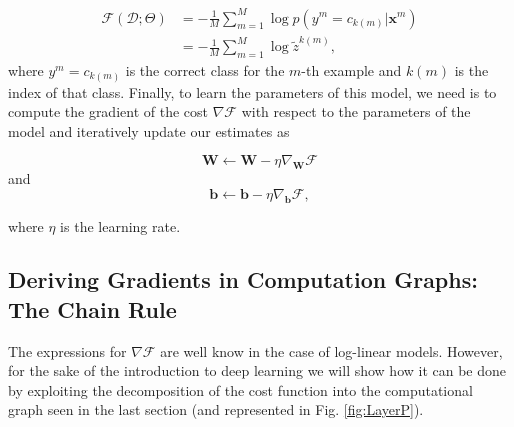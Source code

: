 \begin{align}
\mathcal{F}(\mathcal{D};\Theta) 
& = -\frac{1}{M}\sum_{m=1}^{M} \log p(y^m=c_{k(m)} | \mathbf{x}^m) \\
& = -\frac{1}{M}\sum_{m=1}^{M} \log \tilde{{z}}^{k(m)} ,
\label{eq:CostLogPos}
\end{align}
%
where $y^m=c_{k(m)}$ is the correct class for the $m$-th
example and $k(m)$ is the index of that class.
Finally, to learn the parameters of this model, we need is to compute the gradient
of the cost $\nabla\mathcal{F}$ with respect to the parameters of the model and
iteratively update our estimates as 

\begin{equation}
\mathbf{W} \leftarrow \mathbf{W} - \eta \nabla_\mathbf{W}\mathcal{F}
\end{equation}
and
\begin{equation}
\mathbf{b} \leftarrow \mathbf{b} - \eta \nabla_\mathbf{b}\mathcal{F},
\end{equation}

\noindent where $\eta$ is the learning rate.



\subsection{Deriving Gradients in Computation Graphs: The Chain Rule}

The expressions for $\nabla\mathcal{F}$ are well know in the case of log-linear models. However, for
the sake of the introduction to deep learning we will show how it can
be done by exploiting the decomposition of the cost function into the computational
graph seen in the last section (and represented in Fig. \ref{fig:LayerP}).  

